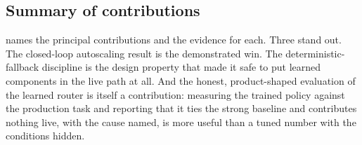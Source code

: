 \subsection{Summary of contributions}
\label{conc:contributions}

 names the principal contributions and the evidence for
each. Three stand out. The closed-loop autoscaling result is the demonstrated win. The
deterministic-fallback discipline is the design property that made it safe to put learned
components in the live path at all. And the honest, product-shaped evaluation of the
learned router is itself a contribution: measuring the trained policy against the
production task and reporting that it ties the strong baseline and contributes nothing
live, with the cause named, is more useful than a tuned number with the conditions
hidden.

